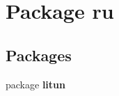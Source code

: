 \section{Package ru}
\label{namespaceru}
\subsection*{Packages}
\begin{DoxyCompactItemize}
\item 
package \textbf{ litun}
\end{DoxyCompactItemize}
